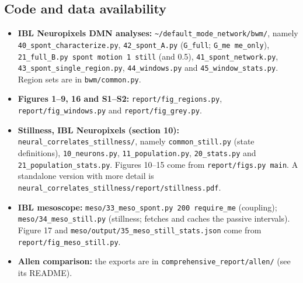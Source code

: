 \documentclass[10pt,a4paper]{article}
\begin{document}
\subsection{Code and data availability}
\begin{itemize}
\item \textbf{IBL Neuropixels DMN analyses:} \texttt{\textasciitilde{}/\allowbreak{}default\_\allowbreak{}mode\_\allowbreak{}network/\allowbreak{}bwm/\allowbreak{}}, namely \texttt{40\_\allowbreak{}spont\_\allowbreak{}characterize.py}, \texttt{42\_\allowbreak{}spont\_\allowbreak{}A.py} (\texttt{G\_\allowbreak{}full}; \texttt{G\_\allowbreak{}me me\_\allowbreak{}only}), \texttt{21\_\allowbreak{}full\_\allowbreak{}B.py spont motion 1 still} (and 0.5), \texttt{41\_\allowbreak{}spont\_\allowbreak{}network.py}, \texttt{43\_\allowbreak{}spont\_\allowbreak{}single\_\allowbreak{}region.py}, \texttt{44\_\allowbreak{}windows.py} and \texttt{45\_\allowbreak{}window\_\allowbreak{}stats.py}. Region sets are in \texttt{bwm/\allowbreak{}common.py}.
\item \textbf{Figures 1--9, 16 and S1--S2:} \texttt{report/\allowbreak{}fig\_\allowbreak{}regions.py}, \texttt{report/\allowbreak{}fig\_\allowbreak{}windows.py} and \texttt{report/\allowbreak{}fig\_\allowbreak{}grey.py}.
\item \textbf{Stillness, IBL Neuropixels (section 10):} \texttt{neural\_\allowbreak{}correlates\_\allowbreak{}stillness/\allowbreak{}}, namely \texttt{common\_\allowbreak{}still.py} (state definitions), \texttt{10\_\allowbreak{}neurons.py}, \texttt{11\_\allowbreak{}population.py}, \texttt{20\_\allowbreak{}stats.py} and \texttt{21\_\allowbreak{}population\_\allowbreak{}stats.py}. Figures 10--15 come from \texttt{report/\allowbreak{}figs.py main}. A standalone version with more detail is \texttt{neural\_\allowbreak{}correlates\_\allowbreak{}stillness/\allowbreak{}report/\allowbreak{}stillness.pdf}.
\item \textbf{IBL mesoscope:} \texttt{meso/\allowbreak{}33\_\allowbreak{}meso\_\allowbreak{}spont.py 200 require\_\allowbreak{}me} (coupling); \texttt{meso/\allowbreak{}34\_\allowbreak{}meso\_\allowbreak{}still.py} (stillness; fetches and caches the passive intervals). Figure 17 and \texttt{meso/\allowbreak{}output/\allowbreak{}35\_\allowbreak{}meso\_\allowbreak{}still\_\allowbreak{}stats.json} come from \texttt{report/\allowbreak{}fig\_\allowbreak{}meso\_\allowbreak{}still.py}.
\item \textbf{Allen comparison:} the exports are in \texttt{comprehensive\_\allowbreak{}report/\allowbreak{}allen/\allowbreak{}} (see its README). 

\end{itemize}
\end{document}
